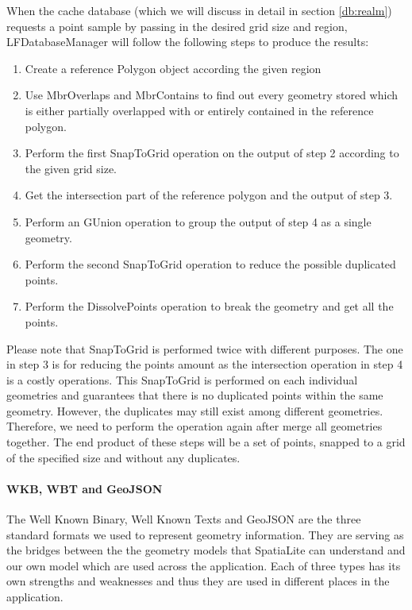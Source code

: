 \documentclass[12pt,a4paper]{article}
\renewcommand\texttt[1]{{\ttfamily\color{textttColor}#1}}
\begin{document}
                When the cache database (which we will discuss in detail in section \ref{db:realm}) requests a point sample by passing in the desired grid size and region, \texttt{LFDatabaseManager} will follow the following steps to produce the results:
                \begin{enumerate}
                    \setlength\itemsep{-0.5em}
                    \item Create a reference \texttt{Polygon} object according the given region
                    \item Use \texttt{MbrOverlaps} and \texttt{MbrContains} to find out every geometry stored which is either partially overlapped with or entirely contained in the reference polygon.
                    \item Perform the first \texttt{SnapToGrid} operation on the output of step 2 according to the given grid size.
                    \item Get the intersection part of the reference polygon and the output of step 3.
                    \item Perform an \texttt{GUnion} operation to group the output of step 4 as a single geometry.
                    \item Perform the second \texttt{SnapToGrid} operation to reduce the possible duplicated points.
                    \item Perform the \texttt{DissolvePoints} operation to break the geometry and get all the points.
                \end{enumerate}
                
                Please note that \texttt{SnapToGrid} is performed twice with different purposes. The one in step 3 is for reducing the points amount as the intersection operation in step 4 is a costly operations. This \texttt{SnapToGrid} is performed on each individual geometries and guarantees that there is no duplicated points within the same geometry. However, the duplicates may still exist among different geometries. Therefore, we need to perform the operation again after merge all geometries together. The end product of these steps will be a set of points, snapped to a grid of the specified size and without any duplicates.
                
            \paragraph{WKB, WBT and GeoJSON}
                The Well Known Binary, Well Known Texts and GeoJSON are the three standard formats we used to represent geometry information. They are serving as the bridges between the the geometry models that SpatiaLite can understand and our own model which are used across the application. Each of three types has its own strengths and weaknesses and thus they are used in different places in the application.
                
\end{document}
